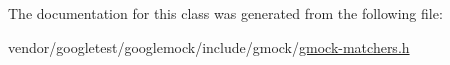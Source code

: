 The documentation for this class was generated from the following file\+:\begin{DoxyCompactItemize}
\item 
vendor/googletest/googlemock/include/gmock/\hyperlink{gmock-matchers_8h}{gmock-\/matchers.\+h}\end{DoxyCompactItemize}
